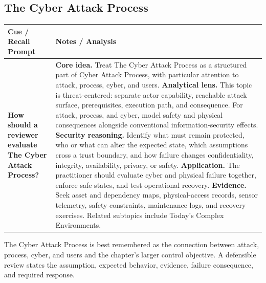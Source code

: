 \documentclass[11pt]{article}
\newcommand{\CornellHeader}{%
\rowcolor{Navy}\color{white}\bfseries Cue / Recall Prompt & \color{white}\bfseries Notes / Analysis\\\hline}
\newcommand{\CornellRow}[2]{%
\cellcolor{CueGray}\RaggedRight\textbf{#1} & \RaggedRight #2\\\hline}
\begin{document}
\subsection*{The Cyber Attack Process}
\begin{longtable}{>{\RaggedRight\arraybackslash}p{}|>{\RaggedRight\arraybackslash}p{}}
\CornellHeader
\CornellRow{How should a reviewer evaluate The Cyber Attack Process?}{\textbf{Core idea.} Treat The Cyber Attack Process as a structured part of Cyber Attack Process, with particular attention to attack, process, cyber, and users. \textbf{Analytical lens.} This topic is threat-centered: separate actor capability, reachable attack surface, prerequisites, execution path, and consequence. For attack, process, and cyber, model safety and physical consequences alongside conventional information-security effects. \textbf{Security reasoning.} Identify what must remain protected, who or what can alter the expected state, which assumptions cross a trust boundary, and how failure changes confidentiality, integrity, availability, privacy, or safety. \textbf{Application.} The practitioner should evaluate cyber and physical failure together, enforce safe states, and test operational recovery. \textbf{Evidence.} Seek asset and dependency maps, physical-access records, sensor telemetry, safety constraints, maintenance logs, and recovery exercises. Related subtopics include Today's Complex Environments.}
\end{longtable}
\begin{topicsummary}
The Cyber Attack Process is best remembered as the connection between attack, process, cyber, and users and the chapter's larger control objective. A defensible review states the assumption, expected behavior, evidence, failure consequence, and required response.
\end{topicsummary}
\end{document}
